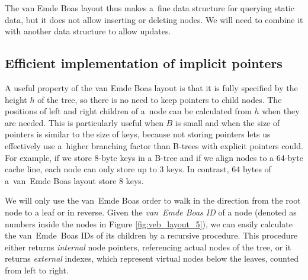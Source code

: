 The van Emde Boas layout thus makes a~fine data structure for querying static
data, but it does not allow inserting or deleting nodes. We will need
to combine it with another data structure to allow updates.

\subsection{Efficient implementation of implicit pointers}
A useful property of the van Emde Boas layout is that it is fully specified
by the height $h$ of the tree, so there is no need to keep pointers to child
nodes. The positions of left and right children of a~node can be calculated
from $h$ when they are needed.
This is particularly useful when $B$ is small and when the size of pointers
is similar to the size of keys, because not storing pointers lets us
effectively use a~higher branching factor than B-trees with explicit
pointers could.
For example, if we store 8-byte keys in a B-tree and if we align nodes to
a 64-byte cache line, each node can only store up to 3 keys. In contrast,
64 bytes of a~van~Emde Boas layout store 8 keys.

We will only use the van~Emde Boas order to walk in the direction from
the root node to a leaf or in reverse.
Given the \emph{van~Emde Boas ID} of a node (denoted as numbers
inside the nodes in Figure \ref{fig:veb_layout_5}),
we can easily calculate the van~Emde~Boas IDs of its children by
a recursive procedure. This procedure either returns \emph{internal} node
pointers, referencing actual nodes of the tree, or it returns \emph{external}
indexes, which represent virtual nodes below the leaves, counted from left
to right.

